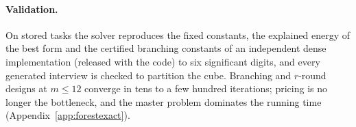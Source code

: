 \paragraph{Validation.}
On stored tasks the solver reproduces the fixed constants, the explained energy of the best form and the certified branching constants of an independent dense implementation (released with the code) to six significant digits, and every generated interview is checked to partition the cube. Branching and $r$-round designs at $m\le12$ converge in tens to a few hundred iterations; pricing is no longer the bottleneck, and the master problem dominates the running time (Appendix~\ref{app:forestexact}).
